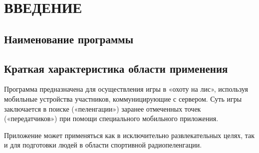 \section{ВВЕДЕНИЕ}

\noindent\subsection{Наименование программы}
    \docTitle

\noindent\subsection{Краткая характеристика области применения}

Программа предназначена для осуществления игры в «охоту на лис», используя мобильные устройства участников, коммуницирующие с сервером. Суть игры заключается в поиске («пеленгации») заранее отмеченных точек («передатчиков») при помощи специального мобильного приложения.

Приложение может применяться как в исключительно развлекательных целях, так и для подготовки людей в области спортивной радиопеленгации.

\clearpage

